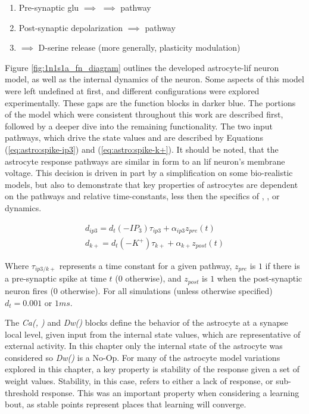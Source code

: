\begin{enumerate}
  \item Pre-synaptic \gls{glu} $\implies$ \ipt $\implies$ \ca pathway
  \item Post-synaptic depolarization \kp $\implies$ \ca pathway
  \item \ca $\implies$ D-serine release (more generally, plasticity modulation)
\end{enumerate}


Figure \ref{fig:1n1s1a_fn_diagram} outlines the developed astrocyte-\gls{lif} neuron
model, as well as the internal dynamics of the neuron. Some aspects of this
model were left undefined at first, and different configurations were explored
experimentally. These gaps are the function blocks in darker blue. The
portions of the model which were consistent throughout this work are described
first, followed by a deeper dive into the remaining functionality. The two input
pathways, which drive the state values \ipt and \kp are described by Equations
(\ref{eq:astro:spike-ip3}) and (\ref{eq:astro:spike-k+}). It should be noted, that
the astrocyte response pathways are similar in form to an \gls{lif} neuron's membrane
voltage. This decision is driven in part by a simplification on some
bio-realistic models, but also to demonstrate that key properties of astrocytes
are dependent on the pathways and relative time-constants, less then the specifics of
\ca, \ipt, or \kp dynamics.

\begin{align}
  d_{ip3} = d_t (-IP_3)\tau_{ip3} + \alpha_{ip3} z_{pre}(t) \label{eq:astro:spike-ip3} \\
  d_{k+} = d_t (-K^+)\tau_{k+} + \alpha_{k+} z_{post}(t) \label{eq:astro:spike-k+}
\end{align}

Where $\tau_{ip3/k+}$ represents a time constant for a given pathway, $z_{pre}$
is $1$ if there is a pre-synaptic spike at time $t$ ($0$ otherwise), and
$z_{post}$ is $1$ when the post-synaptic neuron fires ($0$ otherwise). For all
simulations (unless otherwise specified) $d_t = 0.001$ or $1ms$.

The \emph{Ca(\ipt, \kp)} and \emph{Dw(\ca)} blocks define the behavior
of the astrocyte at a synapse local level, given input from the internal state values,
which are representative of external activity. In this chapter only the internal
state of the astrocyte was considered so \emph{Dw(\ca)} is a
No-Op. For many of the astrocyte model variations explored in this chapter, a
key property is stability of the response given a set of weight
values. Stability, in this case, refers to either a lack of \ca response, or
sub-threshold \ca response. This was an important property when considering
a learning bout, as stable points represent places that learning will converge.

